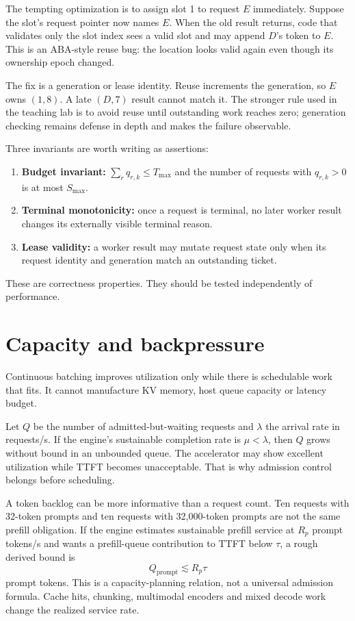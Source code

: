 The tempting optimization is to assign slot 1 to request $E$ immediately.
Suppose the slot's request pointer now names $E$. When the old result returns,
code that validates only the slot index sees a valid slot and may append
$D$'s token to $E$. This is an ABA-style reuse bug: the location looks valid
again even though its ownership epoch changed.

The fix is a generation or lease identity. Reuse increments the generation,
so $E$ owns $(1,8)$. A late $(D,7)$ result cannot match it. The stronger rule
used in the teaching lab is to avoid reuse until outstanding work reaches
zero; generation checking remains defense in depth and makes the failure
observable.

Three invariants are worth writing as assertions:

\begin{enumerate}
\item \textbf{Budget invariant:}
$\sum_r q_{r,k}\le T_{\max}$ and the number of requests with
$q_{r,k}>0$ is at most $S_{\max}$.
\item \textbf{Terminal monotonicity:} once a request is terminal, no later
worker result changes its externally visible terminal reason.
\item \textbf{Lease validity:} a worker result may mutate request state only
when its request identity and generation match an outstanding ticket.
\end{enumerate}

These are correctness properties. They should be tested independently of
performance.

\section{Capacity and backpressure}

Continuous batching improves utilization only while there is schedulable work
that fits. It cannot manufacture KV memory, host queue capacity or latency
budget.

Let $Q$ be the number of admitted-but-waiting requests and $\lambda$ the
arrival rate in requests/s. If the engine's sustainable completion rate is
$\mu<\lambda$, then $Q$ grows without bound in an unbounded queue. The
accelerator may show excellent utilization while TTFT becomes unacceptable.
That is why admission control belongs before scheduling.

A token backlog can be more informative than a request count. Ten requests
with 32-token prompts and ten requests with 32,000-token prompts are not the
same prefill obligation. If the engine estimates sustainable prefill service
at $R_p$ prompt tokens/s and wants a prefill-queue contribution to TTFT below
$\tau$, a rough derived bound is
\[
  Q_{\mathrm{prompt}}\lesssim R_p\tau
\]
prompt tokens. This is a capacity-planning relation, not a universal
admission formula. Cache hits, chunking, multimodal encoders and mixed decode
work change the realized service rate.

